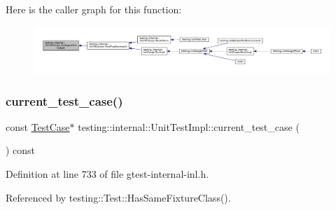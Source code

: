 Here is the caller graph for this function\+:
\nopagebreak
\begin{figure}[H]
\begin{center}
\leavevmode
\includegraphics[width=350pt]{classtesting_1_1internal_1_1UnitTestImpl_a21cd7b2928de03a55b5252f29dd5ae6d_icgraph}
\end{center}
\end{figure}
\mbox{\label{classtesting_1_1internal_1_1UnitTestImpl_ae1f98925197cf344a23a7400deeee4dc}} 
\subsubsection{\texorpdfstring{current\+\_\+test\+\_\+case()}{current\_test\_case()}}
{\footnotesize\ttfamily const \hyperlink{classtesting_1_1TestCase}{Test\+Case}$\ast$ testing\+::internal\+::\+Unit\+Test\+Impl\+::current\+\_\+test\+\_\+case (\begin{DoxyParamCaption}{ }\end{DoxyParamCaption}) const\hspace{0.3cm}{\ttfamily [inline]}}



Definition at line 733 of file gtest-\/internal-\/inl.\+h.



Referenced by testing\+::\+Test\+::\+Has\+Same\+Fixture\+Class().


